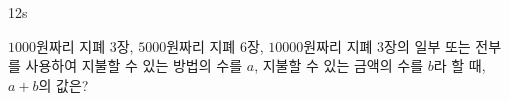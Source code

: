 \documentclass[10pt]{article}
\begin{document}
\begin{pagepair}
\begin{minipage}[t][\probboxheight][t]{0.46\linewidth}
\end{minipage}\hfill
\begin{minipage}[t][\probboxheight][t]{0.46\linewidth}
\begin{problem}{12}{s}
\par\smallskip
$1000$원짜리 지폐 $3$장, $5000$원짜리 지폐 $6$장, $10000$원짜리 지폐 $3$장의 일부 또는 전부를 사용하여 지불할 수 있는 방법의 수를 $a$, 지불할 수 있는 금액의 수를 $b$라 할 때, $a + b$의 값은? 
\begin{choices}
\end{choices}
\end{problem}
\end{minipage}
\end{pagepair}
\end{document}
